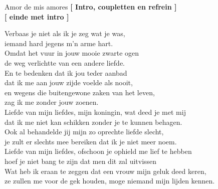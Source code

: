 \begin{song}[vals]{Amor de mis amores}
\textbf{[ Intro, coupletten en refrein ]}\\
\textbf{[ einde met intro ]}\\
 
\begin{translation}
Verbaas je niet als ik je zeg wat je was,\\
iemand hard jegens m'n arme hart.\\
Omdat het vuur in jouw mooie zwarte ogen\\
de weg verlichtte van een andere liefde.\\
\vspace{1ex}En te bedenken dat ik jou teder aanbad\\
dat ik me aan jouw zijde voelde als nooit,\\
en wegens die buitengewone zaken van het leven,\\
zag ik me zonder jouw zoenen.\\
\vspace{1ex}Liefde van mijn liefdes, mijn koningin, wat deed je met mij\\
dat ik me niet kan schikken zonder je te kunnen behagen.\\
Ook al behandelde jij mijn zo oprechte liefde slecht,\\
je zult er slechts mee bereiken dat ik je niet meer noem.\\
Liefde van mijn liefdes, ofschoon je ophield me lief te hebben\\
hoef je niet bang te zijn dat men dit zal uitvissen\\
Wat heb ik eraan te zeggen dat een vrouw mijn geluk deed keren,\\
ze zullen me voor de gek houden, moge niemand mijn lijden kennen.
\end{translation}

\end{song}
